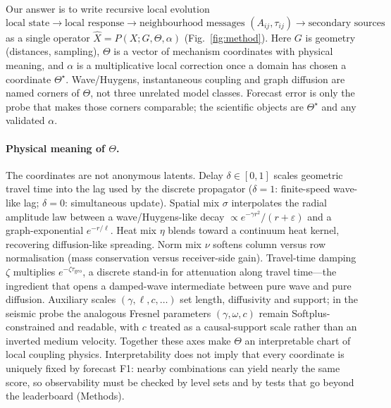 \documentclass[twocolumn,10pt]{article}
\begin{document}
Our answer is to write recursive local evolution
\begin{equation}
\text{local state}\rightarrow
\text{local response}\rightarrow
\text{neighbourhood messages }(A_{ij},\tau_{ij})\rightarrow
\text{secondary sources}
\end{equation}
as a single operator \(\hat{X}=P(X;G,\Theta,\alpha)\) (Fig.~\ref{fig:method}).
Here \(G\) is geometry (distances, sampling), \(\Theta\) is a vector of
mechanism coordinates with physical meaning, and \(\alpha\) is a multiplicative
local correction once a domain has chosen a coordinate \(\Theta^{\star}\).
Wave/Huygens, instantaneous coupling and graph diffusion are named corners of
\(\Theta\), not three unrelated model classes. Forecast error is only the probe
that makes those corners comparable; the scientific objects are
\(\Theta^{\star}\) and any validated \(\alpha\).

\paragraph{Physical meaning of \(\Theta\).}
The coordinates are not anonymous latents. Delay \(\delta\in[0,1]\) scales
geometric travel time into the lag used by the discrete propagator
(\(\delta=1\): finite-speed wave-like lag; \(\delta=0\): simultaneous update).
Spatial mix \(\sigma\) interpolates the radial amplitude law between a
wave/Huygens-like decay \(\propto e^{-\gamma r^{2}}/(r+\varepsilon)\) and a
graph-exponential \(e^{-r/\ell}\). Heat mix \(\eta\) blends toward a continuum
heat kernel, recovering diffusion-like spreading. Norm mix \(\nu\) softens
column versus row normalisation (mass conservation versus receiver-side
gain). Travel-time damping \(\zeta\) multiplies
\(e^{-\zeta\tau_{\mathrm{geo}}}\), a discrete stand-in for attenuation along
travel time---the ingredient that opens a damped-wave intermediate between pure
wave and pure diffusion. Auxiliary scales \((\gamma,\ell,c,\ldots)\) set length,
diffusivity and support; in the seismic probe the analogous Fresnel parameters
\((\gamma,\omega,c)\) remain Softplus-constrained and readable, with \(c\)
treated as a causal-support scale rather than an inverted medium velocity.
Together these axes make \(\Theta\) an interpretable chart of local coupling
physics. Interpretability does not imply that every coordinate is uniquely fixed
by forecast F1: nearby combinations can yield nearly the same score, so
observability must be checked by level sets and by tests that go beyond the
leaderboard (Methods).
\end{document}

